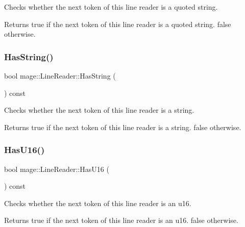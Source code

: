 Checks whether the next token of this line reader is a quoted string.

\begin{DoxyReturn}{Returns}
{\ttfamily true} if the next token of this line reader is a quoted string. {\ttfamily false} otherwise. 
\end{DoxyReturn}
\hypertarget{classmage_1_1_line_reader_a011b5a0d1bd2d157033e3bf7d7323aed}{}\label{classmage_1_1_line_reader_a011b5a0d1bd2d157033e3bf7d7323aed} 
\subsubsection{\texorpdfstring{Has\+String()}{HasString()}}
{\footnotesize\ttfamily bool mage\+::\+Line\+Reader\+::\+Has\+String (\begin{DoxyParamCaption}{ }\end{DoxyParamCaption}) const\hspace{0.3cm}{\ttfamily [protected]}}

Checks whether the next token of this line reader is a string.

\begin{DoxyReturn}{Returns}
{\ttfamily true} if the next token of this line reader is a string. {\ttfamily false} otherwise. 
\end{DoxyReturn}
\hypertarget{classmage_1_1_line_reader_af2c4d2414dbcaa2edb968725d2cd1555}{}\label{classmage_1_1_line_reader_af2c4d2414dbcaa2edb968725d2cd1555} 
\subsubsection{\texorpdfstring{Has\+U16()}{HasU16()}}
{\footnotesize\ttfamily bool mage\+::\+Line\+Reader\+::\+Has\+U16 (\begin{DoxyParamCaption}{ }\end{DoxyParamCaption}) const\hspace{0.3cm}{\ttfamily [protected]}}

Checks whether the next token of this line reader is an {\ttfamily u16}.

\begin{DoxyReturn}{Returns}
{\ttfamily true} if the next token of this line reader is an {\ttfamily u16}. {\ttfamily false} otherwise. 
\end{DoxyReturn}
\hypertarget{classmage_1_1_line_reader_a81ef171c6511a7b270a5b8d58181715c}{}\label{classmage_1_1_line_reader_a81ef171c6511a7b270a5b8d58181715c} 
